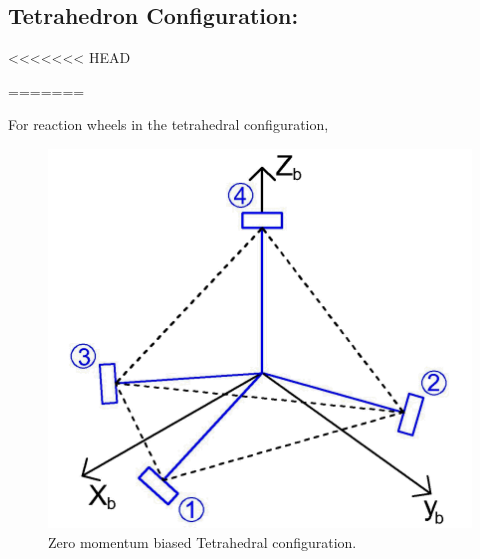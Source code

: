 \documentclass[10pt,a4paper]{report}
\begin{document}
\subsection{Tetrahedron Configuration:}
<<<<<<< HEAD

=======

For reaction wheels in the tetrahedral configuration, 
\begin{figure}[H]
\centering
\includegraphics[scale=0.5]{Tetconfig.png}
\caption{Zero momentum biased Tetrahedral configuration.}
\end{figure}
\end{document}

